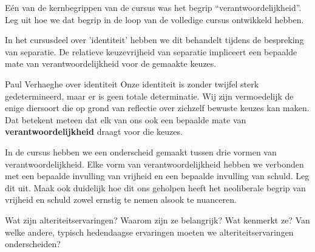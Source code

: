 \documentclass[main.tex]{subfiles}
\begin{document}
\begin{examenvraag}
    \begin{vraag}
        Eén van de kernbegrippen van de cursus was het begrip “verantwoordelijkheid”. Leg uit hoe we dat begrip in de loop van de volledige cursus ontwikkeld hebben.
    \end{vraag}

    \begin{antwoord}
    In het cursusdeel over 'identiteit' hebben we dit behandelt tijdens de bespreking van separatie.
    De relatieve keuzevrijheid van separatie impliceert een bepaalde mate van verantwoordelijkheid voor de gemaakte keuzes.
    \end{antwoord}
    \begin{citaat}{Paul Verhaeghe over identiteit}
    Onze
identiteit is zonder twijfel sterk gedetermineerd, maar er is geen totale determinatie. Wij zijn
vermoedelijk de enige diersoort die op grond van reflectie over zichzelf bewuste keuzes kan maken.
Dat betekent meteen dat elk van ons ook een bepaalde mate van \textbf{verantwoordelijkheid} draagt voor die
keuzes. 
    \end{citaat}
\end{examenvraag}


\begin{examenvraag}
    \begin{vraag}
        In de cursus hebben we een onderscheid gemaakt tussen drie vormen van verantwoordelijkheid. Elke vorm van verantwoordelijkheid hebben we verbonden met een bepaalde invulling van vrijheid en een bepaalde invulling van schuld. Leg dit uit. Maak ook duidelijk hoe dit ons geholpen heeft het neoliberale begrip van vrijheid en schuld zowel ernstig te nemen alsook te nuanceren.
    \end{vraag}

    \begin{antwoord}
    \end{antwoord}
\end{examenvraag}


\begin{examenvraag}
    \begin{vraag}
        Wat zijn alteriteitservaringen? Waarom zijn ze belangrijk? Wat kenmerkt ze? Van welke andere, typisch hedendaagse ervaringen moeten we alteriteitservaringen onderscheiden?
    \end{vraag}

    \begin{antwoord}
    \end{antwoord}
\end{examenvraag}
\end{document}
